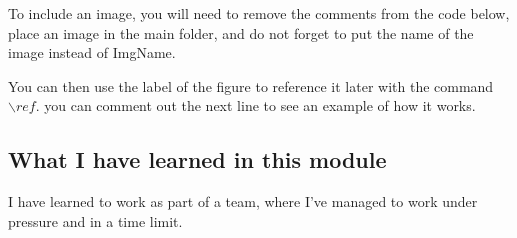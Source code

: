 To include an image, you will need to remove the comments from the code below, place an image in the main folder, and do not forget to put the name of the image instead of ImgName. 

You can then use the label of the figure to reference it later with the command ${\backslash}ref.$ you can comment out the next line to see an example of how it works.


\subsection{What I have learned in this module}
I have learned to work as part of a team, where I've managed to work under pressure and in a time limit.

